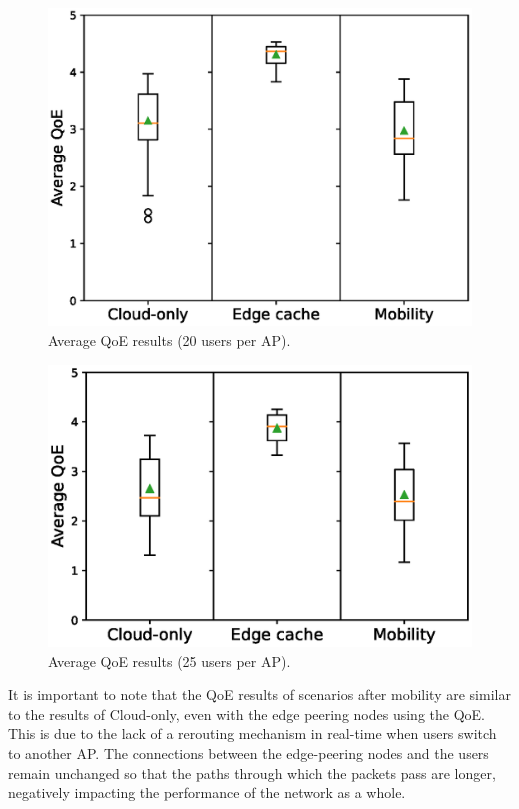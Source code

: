 \begin{figure}[!htb]
    \centering
    \includegraphics[width=\linewidth]{images/QoEBoxplot-20u-2.eps}
    \vspace{-0.6cm}
    \caption{Average QoE results (20 users per AP).}
    \label{fig:exp-boxplot-20}
\end{figure}

\begin{figure}[!htb]
    \centering
    \includegraphics[width=\linewidth]{images/QoEBoxplot-25u-2.eps}
    \vspace{-0.6cm}
    \caption{Average QoE results (25 users per AP).}
    \label{fig:exp-boxplot-25}
\end{figure}


It is important to note that the QoE results of scenarios after mobility are similar to the results of Cloud-only, even with the edge peering nodes using the QoE. This is due to the lack of a rerouting mechanism in real-time when users switch to another AP. The connections between the edge-peering nodes and the users remain unchanged so that the paths through which the packets pass are longer, negatively impacting the performance of the network as a whole.

